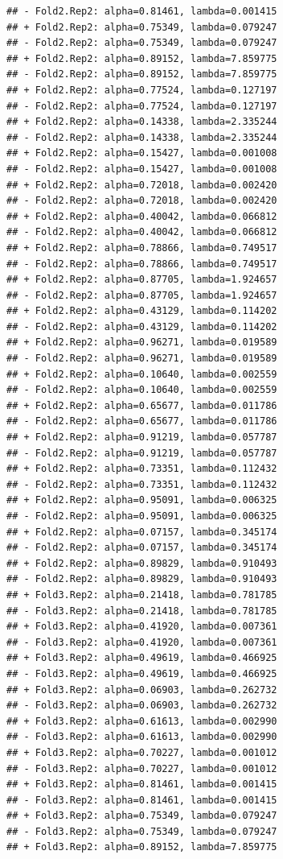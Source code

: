 \documentclass[
]{article}
\begin{document}
\begin{verbatim}
## - Fold2.Rep2: alpha=0.81461, lambda=0.001415 
## + Fold2.Rep2: alpha=0.75349, lambda=0.079247 
## - Fold2.Rep2: alpha=0.75349, lambda=0.079247 
## + Fold2.Rep2: alpha=0.89152, lambda=7.859775 
## - Fold2.Rep2: alpha=0.89152, lambda=7.859775 
## + Fold2.Rep2: alpha=0.77524, lambda=0.127197 
## - Fold2.Rep2: alpha=0.77524, lambda=0.127197 
## + Fold2.Rep2: alpha=0.14338, lambda=2.335244 
## - Fold2.Rep2: alpha=0.14338, lambda=2.335244 
## + Fold2.Rep2: alpha=0.15427, lambda=0.001008 
## - Fold2.Rep2: alpha=0.15427, lambda=0.001008 
## + Fold2.Rep2: alpha=0.72018, lambda=0.002420 
## - Fold2.Rep2: alpha=0.72018, lambda=0.002420 
## + Fold2.Rep2: alpha=0.40042, lambda=0.066812 
## - Fold2.Rep2: alpha=0.40042, lambda=0.066812 
## + Fold2.Rep2: alpha=0.78866, lambda=0.749517 
## - Fold2.Rep2: alpha=0.78866, lambda=0.749517 
## + Fold2.Rep2: alpha=0.87705, lambda=1.924657 
## - Fold2.Rep2: alpha=0.87705, lambda=1.924657 
## + Fold2.Rep2: alpha=0.43129, lambda=0.114202 
## - Fold2.Rep2: alpha=0.43129, lambda=0.114202 
## + Fold2.Rep2: alpha=0.96271, lambda=0.019589 
## - Fold2.Rep2: alpha=0.96271, lambda=0.019589 
## + Fold2.Rep2: alpha=0.10640, lambda=0.002559 
## - Fold2.Rep2: alpha=0.10640, lambda=0.002559 
## + Fold2.Rep2: alpha=0.65677, lambda=0.011786 
## - Fold2.Rep2: alpha=0.65677, lambda=0.011786 
## + Fold2.Rep2: alpha=0.91219, lambda=0.057787 
## - Fold2.Rep2: alpha=0.91219, lambda=0.057787 
## + Fold2.Rep2: alpha=0.73351, lambda=0.112432 
## - Fold2.Rep2: alpha=0.73351, lambda=0.112432 
## + Fold2.Rep2: alpha=0.95091, lambda=0.006325 
## - Fold2.Rep2: alpha=0.95091, lambda=0.006325 
## + Fold2.Rep2: alpha=0.07157, lambda=0.345174 
## - Fold2.Rep2: alpha=0.07157, lambda=0.345174 
## + Fold2.Rep2: alpha=0.89829, lambda=0.910493 
## - Fold2.Rep2: alpha=0.89829, lambda=0.910493 
## + Fold3.Rep2: alpha=0.21418, lambda=0.781785 
## - Fold3.Rep2: alpha=0.21418, lambda=0.781785 
## + Fold3.Rep2: alpha=0.41920, lambda=0.007361 
## - Fold3.Rep2: alpha=0.41920, lambda=0.007361 
## + Fold3.Rep2: alpha=0.49619, lambda=0.466925 
## - Fold3.Rep2: alpha=0.49619, lambda=0.466925 
## + Fold3.Rep2: alpha=0.06903, lambda=0.262732 
## - Fold3.Rep2: alpha=0.06903, lambda=0.262732 
## + Fold3.Rep2: alpha=0.61613, lambda=0.002990 
## - Fold3.Rep2: alpha=0.61613, lambda=0.002990 
## + Fold3.Rep2: alpha=0.70227, lambda=0.001012 
## - Fold3.Rep2: alpha=0.70227, lambda=0.001012 
## + Fold3.Rep2: alpha=0.81461, lambda=0.001415 
## - Fold3.Rep2: alpha=0.81461, lambda=0.001415 
## + Fold3.Rep2: alpha=0.75349, lambda=0.079247 
## - Fold3.Rep2: alpha=0.75349, lambda=0.079247 
## + Fold3.Rep2: alpha=0.89152, lambda=7.859775 

\end{verbatim}
\end{document}
